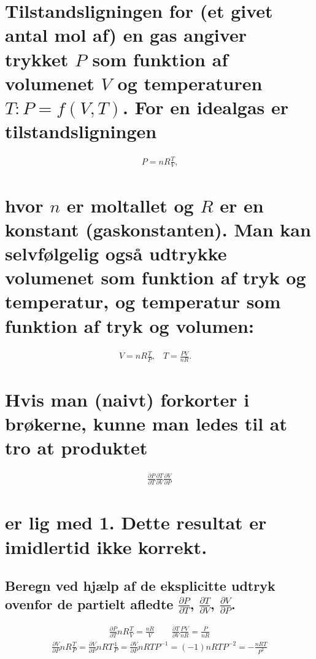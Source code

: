 \documentclass[11pt,a4paper]{article}
\begin{document}
\section
{
    \mdseries
    Tilstandsligningen for (et givet antal mol af) en gas angiver trykket $P$
    som funktion af volumenet $V$ og temperaturen $T: P = f(V,T)$. For en
    idealgas er tilstandsligningen
}
\begin{align}
    P = n R \frac{T}{V}\text{,}
\end{align}
\section*
{
    \mdseries hvor $n$ er moltallet og $R$ er en konstant (gaskonstanten). Man
    kan selvfølgelig også udtrykke volumenet som funktion af tryk og
    temperatur, og temperatur som funktion af tryk og volumen:
}
\begin{align}
    V = n R \frac{T}{P}\text{,} \quad
    T = \frac{PV}{nR}\text{.} \quad
\end{align}
\section*
{
    \mdseries Hvis man (naivt) forkorter i brøkerne, kunne man ledes til at
    tro at produktet
}
\begin{align}
    \frac{\partial P}{\partial T}
    \frac{\partial T}{\partial V}
    \frac{\partial V}{\partial P}
    \label{eqn:partial-prod}
\end{align}
\section*
{
    \mdseries er lig med 1. Dette resultat er imidlertid ikke korrekt.
}
\subsection
{
    \mdseries Beregn ved hjælp af de eksplicitte udtryk ovenfor de partielt
    afledte $\frac{\partial P}{\partial T}$, $\frac{\partial T}{\partial V}$,
    $\frac{\partial V}{\partial P}$.
}
\begin{align}
    \frac{\partial P}{\partial T} n R \frac{T}{V}
    = \frac{n R}{V}
    \qquad
    \frac{\partial T}{\partial V} \frac{P V}{n R}
    = \frac{P}{n R}
\end{align}
\begin{align}
    \frac{\partial V}{\partial P} n R \frac{T}{P}
    = \frac{\partial V}{\partial P} n R T \frac{1}{P}
    = \frac{\partial V}{\partial P} n R T P^{-1}
    = (-1)n R T P^{-2}
    = -\frac{n R T}{P^2}
\end{align}
\end{document}

